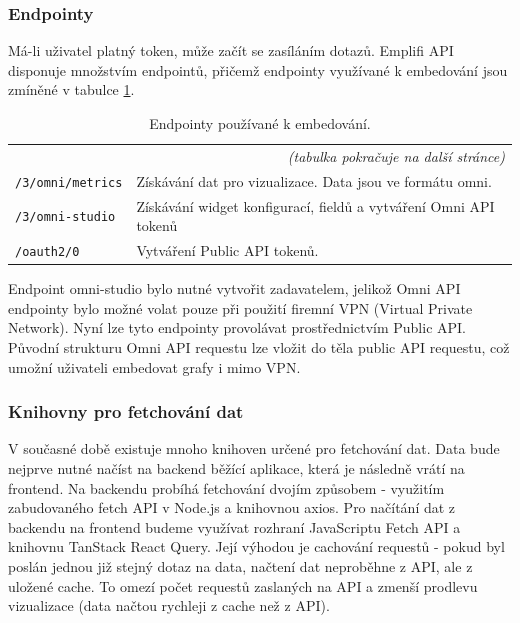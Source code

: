 \documentclass[czech, bc, kiv, he, iso690numb]{fasthesis}
\begin{document}
\subsubsection{Endpointy}

Má-li uživatel platný token, může začít se zasíláním dotazů. Emplifi API disponuje množstvím endpointů, přičemž endpointy využívané k embedování jsou zmíněné v tabulce \ref{tab:embeddingEndpoints}. 

\begin{center}
	\begin{longtable}{p{}p{}}
	\caption{Endpointy používané k embedování.}
	\label{tab:embeddingEndpoints}\\
	\toprule[1.5pt]
	\endhead
	\midrule
	\multicolumn{2}{r}{\textit{(tabulka pokračuje na další stránce)}}\\
	\endfoot
	\bottomrule[1.5pt]
	\endlastfoot
	\verb"/3/omni/metrics" & Získávání dat pro vizualizace. Data jsou ve formátu omni. \\
	\midrule
	\verb"/3/omni-studio" &  Získávání widget konfigurací, fieldů a vytváření Omni API tokenů\\
	\midrule
	\verb"/oauth2/0" &  Vytváření Public API tokenů. \\
	\end{longtable}
\end{center}

Endpoint omni-studio bylo nutné vytvořit zadavatelem, jelikož Omni API endpointy bylo možné volat pouze při použití firemní VPN (Virtual Private Network). Nyní lze tyto endpointy provolávat prostřednictvím Public API. Původní
strukturu Omni API requestu lze vložit do těla public API requestu, což umožní uživateli embedovat grafy i mimo VPN.

\subsubsection{Knihovny pro fetchování dat}

V současné době existuje mnoho knihoven určené pro fetchování dat. Data bude nejprve nutné načíst na backend běžící aplikace, která je následně vrátí na frontend. Na backendu probíhá fetchování dvojím způsobem - 
využitím zabudovaného fetch API v Node.js a knihovnou axios. Pro načítání dat z backendu na frontend budeme využívat rozhraní JavaScriptu Fetch API a knihovnu TanStack React Query. Její výhodou je cachování
requestů \cite{tanstackQueryDocs} - pokud byl poslán jednou již stejný dotaz na data, načtení dat neproběhne z API, ale z uložené cache. To omezí počet requestů zaslaných na API a zmenší prodlevu vizualizace (data načtou rychleji z cache než z API). 
\end{document}
